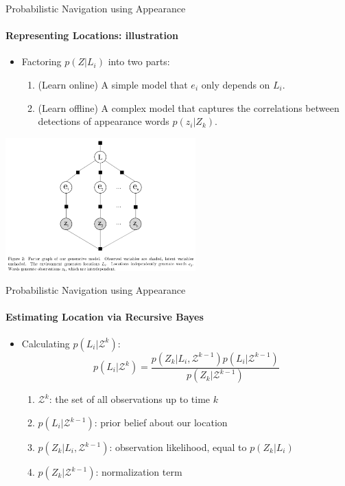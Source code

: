 \documentclass[dvipsnames, handout]{beamer}
\newcommand{\1}{\mathds{1}}	%
\begin{document}
\begin{frame}[t]{Probabilistic Navigation using Appearance}
\framesubtitle{Representing Locations: illustration}
\begin{itemize}
\item Factoring $p(Z|L_i)$ into two parts:
\begin{enumerate}
\item (Learn online) A simple model that $e_i$ only depends on $L_i$.
\item (Learn offline) A complex model that captures the correlations between detections of appearance words $p(z_i|Z_k)$.
\end{enumerate}
\end{itemize}
\begin{center}
\includegraphics[width=0.55\textwidth]{imgs/fig2.png}
\end{center}
\end{frame}

\begin{frame}[t]{Probabilistic Navigation using Appearance}
\framesubtitle{Estimating Location via Recursive Bayes}
\begin{itemize}
\item Calculating $p(L_i|\mathcal{Z}^k)$:
\[p(L_i|\mathcal{Z}^k) = \frac{p(Z_k|L_i, \mathcal{Z}^{k-1})p(L_i|\mathcal{Z}^{k-1})}{p(Z_k|\mathcal{Z}^{k-1})}\]
\begin{enumerate}
\item $\mathcal{Z}^k$: the set of all observations up to time $k$
\item $p(L_i|\mathcal{Z}^{k-1})$: prior belief about our location
\item $p(Z_k|L_i, \mathcal{Z}^{k-1})$: observation likelihood, equal to $p(Z_k|L_i)$
\item $p(Z_k|\mathcal{Z}^{k-1})$: normalization term
\end{enumerate}
\end{itemize}
\end{frame}
\end{document}
